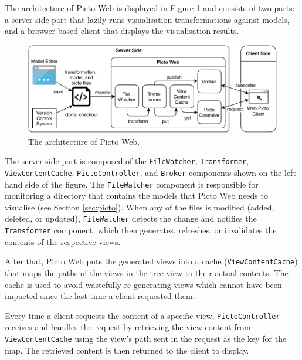 \documentclass[sigconf,review]{acmart}
\begin{document}
The architecture of Picto Web is displayed in Figure \ref{fig:architecture} and consists of two parts: a server-side part that lazily runs visualisation transformations against models, and a browser-based client that displays the visualisation results. 


\begin{figure}[h]
  \centering
  \includegraphics[width=\linewidth]{images/architecture.pdf}
  \caption{The architecture of Picto Web.}
  \label{fig:architecture}
\end{figure}

The server-side part is composed of the \texttt{FileWatcher}, \texttt{Trans\-form\-er}, \texttt{ViewContentCache}, \texttt{PictoController}, and \texttt{Broker} components shown on the left hand side of the figure. The \texttt{FileWatcher} component is responsible for monitoring a directory that contains the models that Picto Web needs to visualise (see Section \ref{sec:picto}). When any of the files is modified (added, deleted, or updated), \texttt{FileWatcher} detects the change and notifies the \texttt{Transformer} component, which then generates, refreshes, or invalidates the contents of the respective views. 

After that, Picto Web puts the generated views into a cache (\texttt{ViewContentCache}) that maps the paths of the views in the tree view to their actual contents. The cache is used to avoid wastefully re-generating views which cannot have been impacted since the last time a client requested them.

Every time a client requests the content of a specific view, \texttt{PictoController} receives and handles the request by retrieving the view content from \texttt{ViewContentCache} using the view's path sent in the request as the key for the map. The retrieved content is then returned to the client to display.
\end{document}
